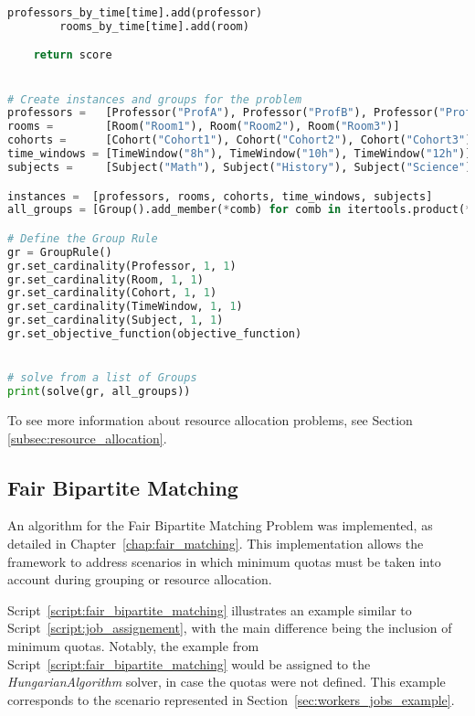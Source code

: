 \begin{lstlisting}[language=Python, caption={Creating and solving the Timetable Scheduling Problem using this framework.}, label={script:time_table}]
        professors_by_time[time].add(professor)
        rooms_by_time[time].add(room)

    return score


# Create instances and groups for the problem
professors =   [Professor("ProfA"), Professor("ProfB"), Professor("ProfC")]
rooms =        [Room("Room1"), Room("Room2"), Room("Room3")]
cohorts =      [Cohort("Cohort1"), Cohort("Cohort2"), Cohort("Cohort3")]
time_windows = [TimeWindow("8h"), TimeWindow("10h"), TimeWindow("12h")]
subjects =     [Subject("Math"), Subject("History"), Subject("Science")]

instances =  [professors, rooms, cohorts, time_windows, subjects]
all_groups = [Group().add_member(*comb) for comb in itertools.product(*instances)]

# Define the Group Rule
gr = GroupRule()
gr.set_cardinality(Professor, 1, 1)
gr.set_cardinality(Room, 1, 1)
gr.set_cardinality(Cohort, 1, 1)
gr.set_cardinality(TimeWindow, 1, 1)
gr.set_cardinality(Subject, 1, 1)
gr.set_objective_function(objective_function)


# solve from a list of Groups
print(solve(gr, all_groups))
\end{lstlisting}

To see more information about resource allocation problems, see Section \ref{subsec:resource_allocation}.


\subsection{Fair Bipartite Matching}

An algorithm for the Fair Bipartite Matching Problem was implemented, as detailed in Chapter~\ref{chap:fair_matching}.  
This implementation allows the framework to address scenarios in which minimum quotas must be taken into account during grouping or resource allocation.

Script~\ref{script:fair_bipartite_matching} illustrates an example similar to Script~\ref{script:job_assignement}, with the main difference being the inclusion of minimum quotas.
Notably, the example from Script~\ref{script:fair_bipartite_matching} would be assigned to the \textit{HungarianAlgorithm} solver, in case the quotas were not defined.
This example corresponds to the scenario represented in Section~\ref{sec:workers_jobs_example}.

